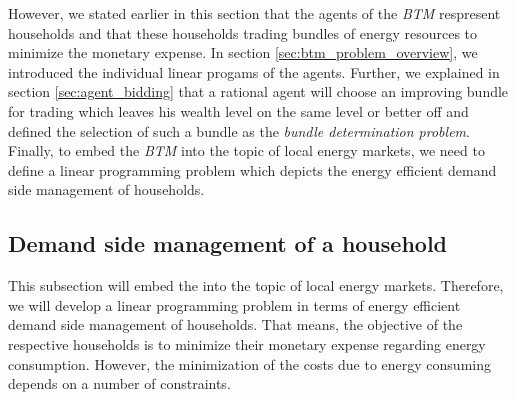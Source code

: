 However, we stated earlier in this section that the agents of the \textit{BTM} respresent households
and that these households trading bundles of energy resources to minimize the monetary expense. 
In section \ref{sec:btm_problem_overview}, we introduced the individual linear progams of the agents.
Further, we explained in section \ref{sec:agent_bidding} that a rational agent will choose an improving bundle for 
trading which leaves his wealth level on the same level or better off and defined the selection of such a bundle 
as the \textit{bundle determination problem}.
Finally, to embed the \textit{BTM} into the topic of local energy markets, we need to define 
a linear programming problem which depicts the energy efficient demand side management of households.

\subsection{Demand side management of a household}
This subsection will embed the  into the topic of local energy markets. 
Therefore, we will develop a linear programming problem in terms of energy efficient demand side management of households.  
That means, the objective of the respective households is to minimize their monetary expense regarding energy consumption.
However, the minimization of the costs due to energy consuming depends on a number of constraints. 

